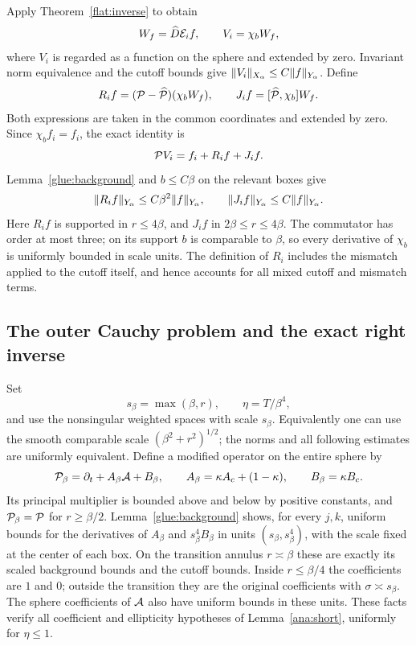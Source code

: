 Apply Theorem~\ref{flat:inverse} to obtain
\[
 W_f=\widehat D\mathcal E_i f,\qquad V_i=\chi_b W_f,
\]
where $V_i$ is regarded as a function on the sphere and extended by
zero.  Invariant norm equivalence and the cutoff bounds give
$\lVert V_i\rVert_{X_\alpha}\le C\lVert f\rVert_{Y_\alpha}$.  Define
\begin{equation}\label{glue:inner-errors}
 R_i f=(\mathcal P-\widehat{\mathcal P})(\chi_bW_f),\qquad
 J_i f=[\widehat{\mathcal P},\chi_b]W_f.
\end{equation}
Both expressions are taken in the common coordinates and extended by
zero.  Since $\chi_b f_i=f_i$, the exact identity is
\begin{equation}\label{glue:inner-identity}
 \mathcal P V_i=f_i+R_i f+J_i f.
\end{equation}
Lemma~\ref{glue:background} and $b\le C\beta$ on the relevant boxes
give
\begin{equation}\label{glue:inner-error-bounds}
 \lVert R_i f\rVert_{Y_\alpha}\le C\beta^2\lVert f\rVert_{Y_\alpha},
 \qquad
 \lVert J_i f\rVert_{Y_\alpha}\le C\lVert f\rVert_{Y_\alpha}.
\end{equation}
Here $R_i f$ is supported in $r\le4\beta$, and $J_i f$ in
$2\beta\le r\le4\beta$.  The commutator has order at most three;
on its support $b$ is comparable to $\beta$, so every derivative of
$\chi_b$ is uniformly bounded in scale units.  The definition of
$R_i$ includes the mismatch applied to the cutoff itself, and hence
accounts for all mixed cutoff and mismatch terms.

\subsection{The outer Cauchy problem and the exact right inverse}

Set
\[
 s_\beta=\max(\beta,r),\qquad \eta=T/\beta^4,
\]
and use the nonsingular weighted spaces with scale $s_\beta$.
Equivalently one can use the smooth comparable scale
$(\beta^2+r^2)^{1/2}$; the norms and all following estimates are
uniformly equivalent.  Define a modified operator on the entire sphere
by
\begin{equation}\label{glue:modified-operator}
 \mathcal P_\beta=\partial_t+A_\beta\mathcal A+B_\beta,
 \qquad
 A_\beta=\kappa A_c+(1-\kappa),\qquad B_\beta=\kappa B_c.
\end{equation}
Its principal multiplier is bounded above and below by positive
constants, and $\mathcal P_\beta=\mathcal P$ for $r\ge\beta/2$.
Lemma~\ref{glue:background} shows, for every $j,k$, uniform bounds for
the derivatives of $A_\beta$ and $s_\beta^4B_\beta$ in units
$(s_\beta,s_\beta^4)$, with the scale fixed at the center of each box.
On the transition annulus $r\asymp\beta$ these are exactly its scaled
background bounds and the cutoff bounds.  Inside $r\le\beta/4$ the
coefficients are $1$ and $0$; outside the transition they are the
original coefficients with $\sigma\asymp s_\beta$.  The sphere
coefficients of $\mathcal A$ also have uniform bounds in these units.  These
facts verify all coefficient and ellipticity hypotheses of
Lemma~\ref{ana:short}, uniformly for $\eta\le1$.

